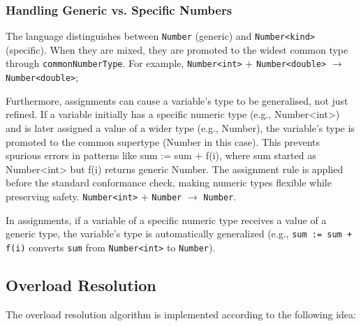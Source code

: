 \documentclass[12pt,a4paper]{report}
\begin{document}
\subsubsection{Handling Generic vs. Specific Numbers}

The language distinguishes between \texttt{Number} (generic) and \texttt{Number<kind>} (specific).
When they are mixed, they are promoted to the widest common type through \texttt{commonNumberType}. For example, \texttt{Number<int>} $+$ \texttt{Number<double>} $\to$ \texttt{Number<double>};

Furthermore, assignments can cause a variable's type to be generalised, not just refined. If a variable initially has a specific numeric type (e.g., Number<int>) and
 is later assigned a value of a wider type (e.g., Number), the variable's type is promoted to the common supertype (Number in this case). This prevents spurious errors in patterns like sum := sum + f(i),
  where sum started as Number<int> but f(i) returns generic Number.
 The assignment rule is applied before the standard conformance check, making numeric types flexible while preserving safety.
\texttt{Number<int>} $+$ \texttt{Number} $\to$ \texttt{Number}.

In assignments, if a variable of a specific numeric type receives a value of a generic type, the variable's type is automatically generalized (e.g., \texttt{sum := sum + f(i)} converts \texttt{sum} from \texttt{Number<int>} to \texttt{Number}).

\subsection{Overload Resolution}

The overload resolution algorithm is implemented according to the following idea:
\end{document}
